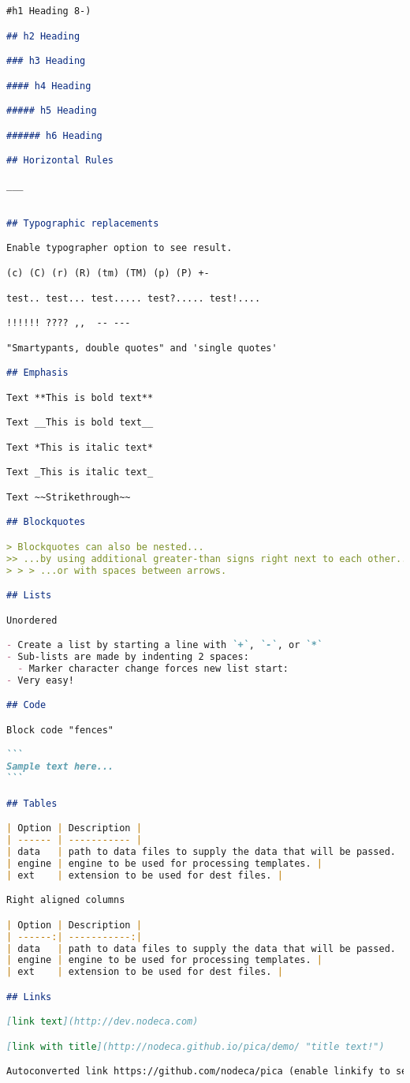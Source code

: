 \begin{lstlisting}[language=markdown,caption={exercise\_02.md},captionpos=b]
#h1 Heading 8-)

## h2 Heading

### h3 Heading

#### h4 Heading

##### h5 Heading

###### h6 Heading

## Horizontal Rules

___


## Typographic replacements

Enable typographer option to see result.

(c) (C) (r) (R) (tm) (TM) (p) (P) +-

test.. test... test..... test?..... test!....

!!!!!! ???? ,,  -- ---

"Smartypants, double quotes" and 'single quotes'

## Emphasis

Text **This is bold text**

Text __This is bold text__

Text *This is italic text*

Text _This is italic text_

Text ~~Strikethrough~~

## Blockquotes

> Blockquotes can also be nested...
>> ...by using additional greater-than signs right next to each other...
> > > ...or with spaces between arrows.

## Lists

Unordered

- Create a list by starting a line with `+`, `-`, or `*`
- Sub-lists are made by indenting 2 spaces:
  - Marker character change forces new list start:
- Very easy!

## Code

Block code "fences"

```
Sample text here...
```

## Tables

| Option | Description |
| ------ | ----------- |
| data   | path to data files to supply the data that will be passed. |
| engine | engine to be used for processing templates. |
| ext    | extension to be used for dest files. |

Right aligned columns

| Option | Description |
| ------:| -----------:|
| data   | path to data files to supply the data that will be passed. |
| engine | engine to be used for processing templates. |
| ext    | extension to be used for dest files. |

## Links

[link text](http://dev.nodeca.com)

[link with title](http://nodeca.github.io/pica/demo/ "title text!")

Autoconverted link https://github.com/nodeca/pica (enable linkify to see)
\end{lstlisting}

